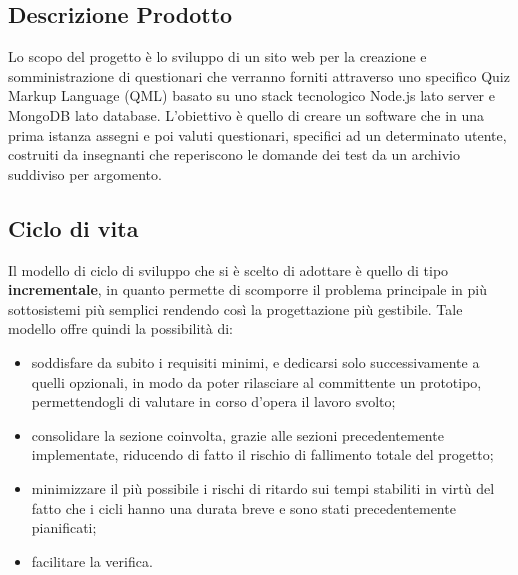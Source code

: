 \documentclass[12pt,a4paper]{article}
\begin{document}
\subsection{Descrizione Prodotto}
Lo scopo del progetto è lo sviluppo di un sito web per la creazione e somministrazione di questionari che verranno forniti attraverso uno specifico Quiz Markup Language (QML) basato su uno stack tecnologico Node.js lato server e MongoDB lato database. L'obiettivo è quello di creare un software che in una prima istanza assegni e poi valuti questionari, specifici ad un determinato utente, costruiti da insegnanti che reperiscono le domande dei test da un archivio suddiviso per argomento.

\subsection{Ciclo di vita}
Il modello di ciclo di sviluppo che si è scelto di adottare è quello di tipo \textbf{incrementale}, in quanto permette di scomporre il problema principale in più sottosistemi più semplici rendendo così la progettazione più gestibile. Tale modello offre quindi la possibilità di:
\begin{itemize}
	\item soddisfare da subito i requisiti minimi, e dedicarsi solo successivamente a quelli opzionali, in modo da poter rilasciare al committente un prototipo, permettendogli di valutare in corso d'opera il lavoro svolto;
	\item consolidare la sezione coinvolta, grazie alle sezioni precedentemente implementate, riducendo di fatto il rischio di fallimento totale del progetto;
	\item minimizzare il più possibile i rischi di ritardo sui tempi stabiliti in virtù del fatto che i cicli hanno una durata breve e sono stati precedentemente pianificati;
	\item facilitare la verifica.
\end{itemize}
\end{document}
